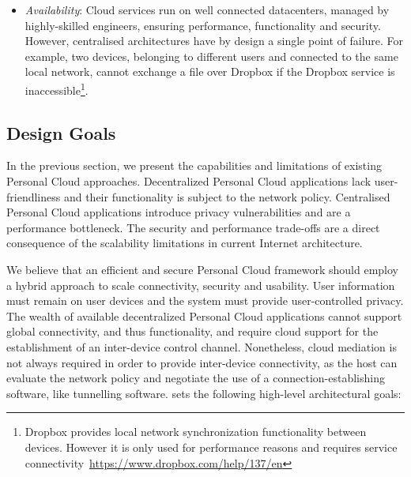 \begin{itemize}
\item {\it Availability}\/: Cloud services run on well connected
  datacenters, managed by highly-skilled engineers, ensuring performance,
  functionality and security. However, centralised architectures have  by design a single
  point of failure. For example, two devices, belonging to different
  users and connected to the same local network, cannot exchange a file over
  Dropbox if the Dropbox service is inaccessible\footnote{Dropbox provides
    local network synchronization functionality between devices. However it is only
    used for performance reasons and requires service
    connectivity~\url{https://www.dropbox.com/help/137/en}}. 

\end{itemize}

\subsection{Design Goals} \label{sec:sp-challenges}

In the previous section, we present the capabilities and limitations of existing
Personal Cloud approaches. Decentralized Personal Cloud applications lack
user-friendliness and their functionality is subject to the network policy.
Centralised Personal Cloud applications introduce privacy vulnerabilities and
are a performance bottleneck. The security and performance trade-offs are a
direct consequence of the scalability limitations in current Internet
architecture. 

We believe that an efficient and secure Personal Cloud framework should employ
a hybrid approach to scale connectivity, security and usability.  User
information must remain on user devices and the system must provide
user-controlled privacy. The wealth of available decentralized Personal Cloud
applications cannot support global connectivity, and thus functionality, and
require cloud support for the establishment of an inter-device control channel.
Nonetheless, cloud mediation is not always required in order to provide
inter-device connectivity, as the host can evaluate the network policy and
negotiate the use of a connection-establishing software, like tunnelling
software.  \signpost sets the following high-level architectural goals:

